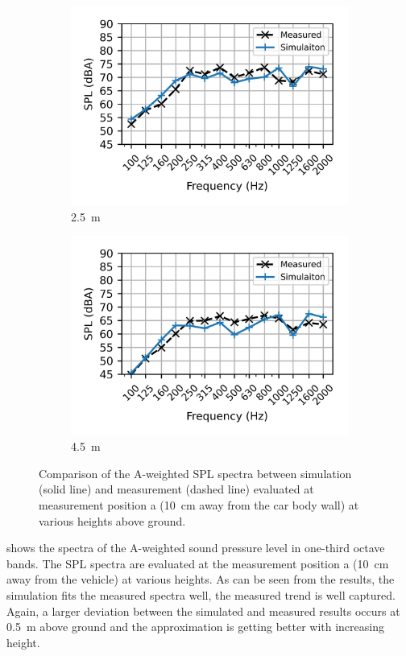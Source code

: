 \begin{figure}
\begin{subfigure}[b]{0.49\textwidth}
		\centering
		\includegraphics{fig/chap5/initial_model/freq_spectrum/pos_10cm_2pt5m.png}
		\caption{\SI{2.5}{\meter}}
	\end{subfigure}
	\hfill
	\begin{subfigure}[b]{0.49\textwidth}
		\centering
		\includegraphics{fig/chap5/initial_model/freq_spectrum/pos_10cm_4pt5m.png}
		\caption{\SI{4.5}{\meter}}
	\end{subfigure}
	\caption{Comparison of the A-weighted SPL spectra between simulation (solid line) and measurement (dashed line) evaluated at measurement position a (\SI{10}{\centi\meter} away from the car body wall) at various heights above ground.}
	\label{fig:freq_spectrum}
\end{figure}
%
 shows the spectra of the A-weighted sound pressure level in one-third octave bands. The SPL spectra are evaluated at the measurement position a (\SI{10}{\centi\meter} away from the vehicle) at various heights. As can be seen from the results, the simulation fits the measured spectra well, the measured trend is well captured. Again, a larger deviation between the simulated and measured results occurs at \SI{0.5}{\meter} above ground and the approximation is getting better with increasing height.

